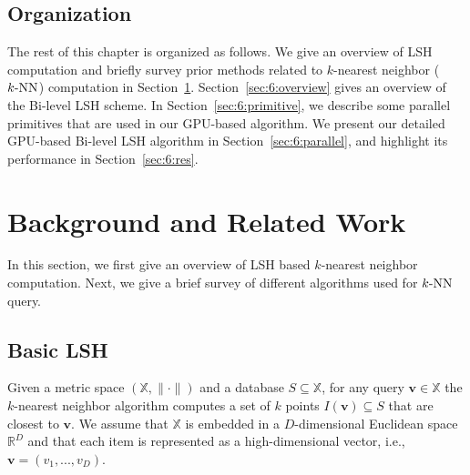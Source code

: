 \subsection{Organization}
The rest of this chapter is organized as follows. We give an overview of LSH computation and briefly survey prior methods related to $k$-nearest neighbor ($k\text{-NN}$) computation in Section~\ref{sec:6:related}. Section~\ref{sec:6:overview}
gives an overview of the Bi-level LSH scheme. In Section~\ref{sec:6:primitive}, we describe some parallel primitives that are used in our GPU-based algorithm. We present our detailed GPU-based Bi-level LSH algorithm in Section~\ref{sec:6:parallel}, and highlight its performance in Section~\ref{sec:6:res}.

\section{Background and Related Work}
\label{sec:6:related}

In this section, we first give an overview of LSH based $k$-nearest neighbor computation. Next, we give a brief survey of different algorithms used for $k\text{-NN}$ query.

\subsection{Basic LSH}
\label{sec:6:related:basic}
Given a metric space $(\mathbb X, \|\cdot\|)$ and a database $S \subseteq \mathbb X$, for any query $\mathbf v \in \mathbb X$ the $k$-nearest neighbor algorithm computes a set of $k$ points $I(\mathbf v) \subseteq S$ that are closest to $\mathbf v$. We assume that $\mathbb X$ is embedded in a $D$-dimensional Euclidean space $\mathbb{R}^D$ and that each item is represented as a high-dimensional vector, i.e., $\mathbf v = (v_1, ..., v_D)$.

